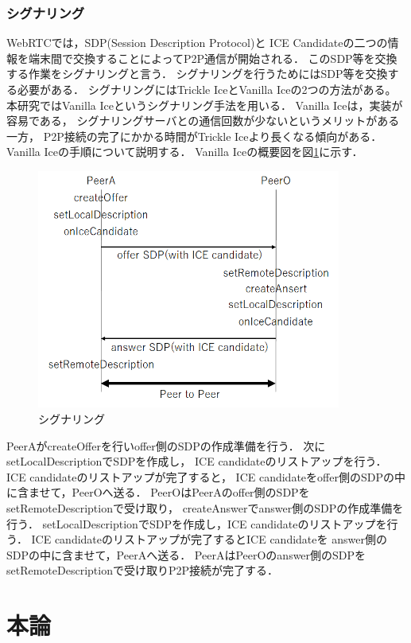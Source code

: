 \documentclass[sotsuron]{jcsie}
\begin{document}
\subsection{シグナリング}
WebRTCでは，SDP(Session Description Protocol)と
ICE Candidateの二つの情報を端末間で交換することによってP2P通信が開始される．
このSDP等を交換する作業をシグナリングと言う．
シグナリングを行うためにはSDP等を交換する必要がある．
シグナリングにはTrickle IceとVanilla Iceの2つの方法がある。
本研究ではVanilla Iceというシグナリング手法を用いる．
Vanilla Iceは，実装が容易である，
シグナリングサーバとの通信回数が少ないというメリットがある一方，
P2P接続の完了にかかる時間がTrickle Iceより長くなる傾向がある．
Vanilla Iceの手順について説明する．
Vanilla Iceの概要図を図\ref{fig:signaling}に示す．
\begin{figure}[H]
	\centering
	\includegraphics[width=10cm]{./assets/image/signaling.png}
	\caption{シグナリング}
	\label{fig:signaling}
\end{figure}
PeerAがcreateOfferを行いoffer側のSDPの作成準備を行う．
次にsetLocalDescriptionでSDPを作成し，
ICE candidateのリストアップを行う．
ICE candidateのリストアップが完了すると，
ICE candidateをoffer側のSDPの中に含ませて，PeerOへ送る．
PeerOはPeerAのoffer側のSDPをsetRemoteDescriptionで受け取り，
createAnswerでanswer側のSDPの作成準備を行う．
setLocalDescriptionでSDPを作成し，ICE candidateのリストアップを行う．
ICE candidateのリストアップが完了するとICE candidateを
answer側のSDPの中に含ませて，PeerAへ送る．
PeerAはPeerOのanswer側のSDPをsetRemoteDescriptionで受け取りP2P接続が完了する．

\chapter{本論}
\end{document}

